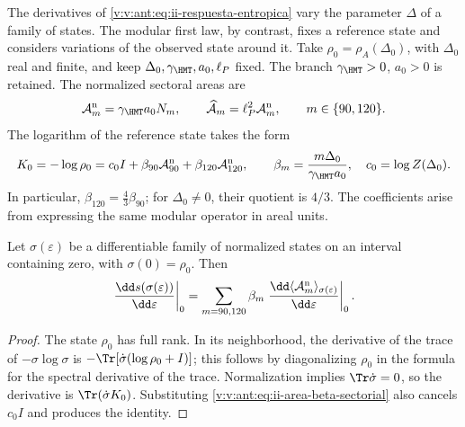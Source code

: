 The derivatives of \eqref{v:v:ant:eq:ii-respuesta-entropica} vary the parameter
\(\Delta\) of a family of states. The modular first law, by contrast, fixes
a reference state and considers variations of the observed state
around it. Take
\(\rho_0=\rho_A(\Delta_0)\), with \(\Delta_0\) real and finite,
and keep \(\Delta_0,\gamma_{\HMT},a_0,\ell_P\) fixed.
The branch \(\gamma_{\HMT}>0\), \(a_0>0\) is retained.
The normalized sectoral areas are
\begin{equation}
 \mathcal A_m^{\rm n}=\gamma_{\HMT}a_0N_m,
 \qquad
 \widehat{\mathcal A}_m=\ell_P^2\mathcal A_m^{\rm n},
 \qquad m\in\{90,120\}.
 \label{v:v:ant:eq:ii-area-sector-normalizado}
\end{equation}
The logarithm of the reference state takes the form
\begin{equation}
 K_0=-\log\rho_0
 =c_0I+\beta_{90}\mathcal A_{90}^{\rm n}
         +\beta_{120}\mathcal A_{120}^{\rm n},
 \qquad
 \beta_m=\frac{m\Delta_0}{\gamma_{\HMT}a_0},
 \quad c_0=\log Z(\Delta_0).
 \label{v:v:ant:eq:ii-area-beta-sectorial}
\end{equation}
In particular, \(\beta_{120}=\tfrac43\beta_{90}\); for
\(\Delta_0\ne0\), their quotient is \(4/3\). The coefficients
arise from expressing the same modular operator in areal units.

\begin{theorem}
\label{v:v:ant:thm:ii-area-primera-ley}
Let \(\sigma(\varepsilon)\) be a differentiable family of normalized
states on an interval containing zero, with
\(\sigma(0)=\rho_0\). Then
\begin{equation}
 \left.\frac{\dd s(\sigma(\varepsilon))}{\dd\varepsilon}\right|_0
 =\sum_{m=90,120}\beta_m
   \left.\frac{\dd\langle\mathcal A_m^{\rm n}\rangle_
                       {\sigma(\varepsilon)}}{\dd\varepsilon}\right|_0.
 \label{v:v:ant:eq:ii-area-primera-ley}
\end{equation}
\end{theorem}
\begin{proof}
The state \(\rho_0\) has full rank. In its neighborhood, the derivative
of the trace of \(-\sigma\log\sigma\) is
\(-\Tr[\dot\sigma(\log\rho_0+I)]\); this follows by diagonalizing
\(\rho_0\) in the formula for the spectral derivative of the trace.
Normalization implies \(\Tr\dot\sigma=0\), so the
derivative is \(\Tr(\dot\sigma K_0)\). Substituting
\eqref{v:v:ant:eq:ii-area-beta-sectorial} also cancels \(c_0I\) and
produces the identity.
\end{proof}

